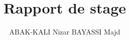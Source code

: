\documentclass[a4paper,12pt,final]{article}
\title{Rapport de stage}
\author{ABAK-KALI Nizar BAYASSI Majd}
\date{}
\begin{document}


\cleardoublepage

\tableofcontents
\sloppy

\cleardoublepage 



\cleardoublepage



\cleardoublepage



\cleardoublepage



\cleardoublepage


\end{document}
